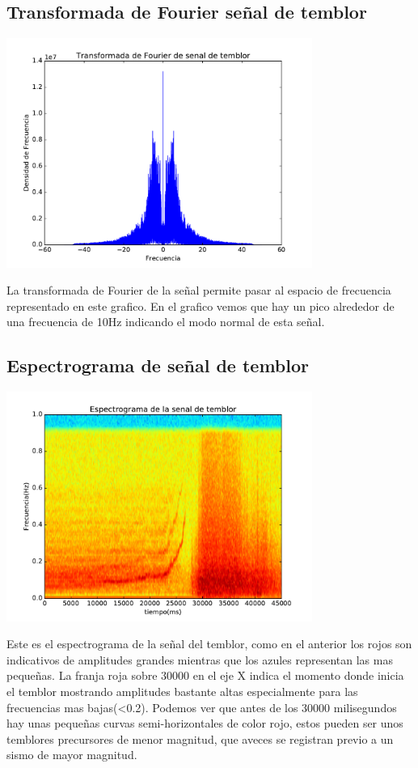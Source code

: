 \documentclass[11pt,letterpaper]{exam}
\begin{document}
\subsection{Transformada de Fourier señal de temblor}
\begin{center}
\includegraphics[width=10cm]{Fourier_temblor.pdf} 
\end{center}
La transformada de Fourier de la señal permite pasar al espacio de frecuencia representado en este grafico. En el grafico vemos que hay un pico alrededor de una frecuencia de 10Hz indicando el modo normal de esta señal.

\subsection{Espectrograma de señal de temblor}
\begin{center}
\includegraphics[width=10cm]{espec_temblor.pdf} 
\end{center}
Este es el espectrograma de la señal del temblor, como en el anterior los rojos son indicativos de amplitudes grandes mientras que los azules representan las mas pequeñas. La franja roja sobre 30000 en el eje X indica el momento donde inicia el temblor mostrando amplitudes bastante altas especialmente para las frecuencias mas bajas(<0.2). Podemos ver que antes de los 30000 milisegundos hay unas pequeñas curvas semi-horizontales de color rojo, estos pueden ser unos temblores precursores de menor magnitud, que aveces se registran previo a un sismo de mayor magnitud.
\end{document}
